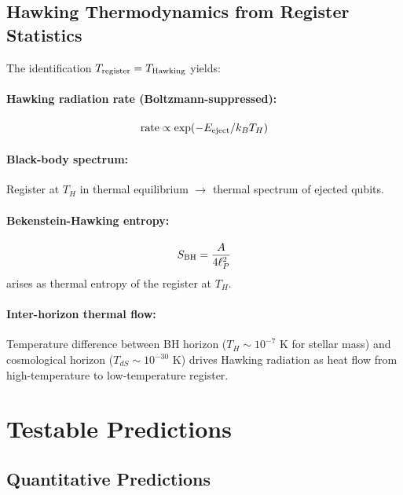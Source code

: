 \documentclass[11pt,a4paper]{article}
\begin{document}
\subsection{Hawking Thermodynamics from Register Statistics}

The identification $T_{\rm register} = T_{\rm Hawking}$ yields:

\paragraph{Hawking radiation rate (Boltzmann-suppressed):}
\begin{equation}
\text{rate} \propto \exp(-E_{\rm eject}/k_B T_H)
\end{equation}

\paragraph{Black-body spectrum:} Register at $T_H$ in thermal equilibrium $\to$ thermal spectrum of ejected qubits.

\paragraph{Bekenstein-Hawking entropy:}
\begin{equation}
S_{\rm BH} = \frac{A}{4\ell_P^2}
\end{equation}
arises as thermal entropy of the register at $T_H$.

\paragraph{Inter-horizon thermal flow:} Temperature difference between BH horizon ($T_H \sim 10^{-7}$ K for stellar mass) and cosmological horizon ($T_{dS} \sim 10^{-30}$ K) drives Hawking radiation as heat flow from high-temperature to low-temperature register.

\section{Testable Predictions}
\label{sec:predictions}

\subsection{Quantitative Predictions}
\end{document}
